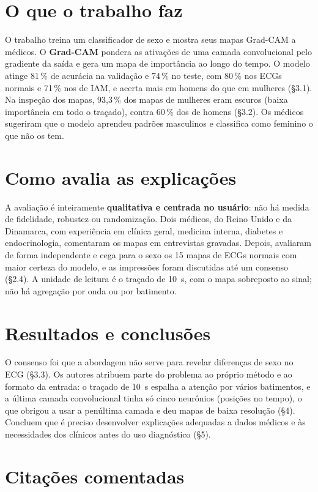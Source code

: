 \documentclass[11pt,a4paper]{article}
\begin{document}
\section{O que o trabalho faz}
O trabalho treina um classificador de sexo e mostra seus mapas Grad-CAM a médicos. O \textbf{Grad-CAM} pondera as ativações de uma camada convolucional pelo gradiente da saída e gera um mapa de importância ao longo do tempo. O modelo atinge 81\,\% de acurácia na validação e 74\,\% no teste, com 80\,\% nos ECGs normais e 71\,\% nos de IAM, e acerta mais em homens do que em mulheres (§3.1). Na inspeção dos mapas, 93,3\,\% dos mapas de mulheres eram escuros (baixa importância em todo o traçado), contra 60\,\% dos de homens (§3.2). Os médicos sugeriram que o modelo aprendeu padrões masculinos e classifica como feminino o que não os tem.

\section{Como avalia as explicações}
A avaliação é inteiramente \textbf{qualitativa e centrada no usuário}: não há medida de fidelidade, robustez ou randomização. Dois médicos, do Reino Unido e da Dinamarca, com experiência em clínica geral, medicina interna, diabetes e endocrinologia, comentaram os mapas em entrevistas gravadas. Depois, avaliaram de forma independente e cega para o sexo os 15 mapas de ECGs normais com maior certeza do modelo, e as impressões foram discutidas até um consenso (§2.4). A unidade de leitura é o traçado de 10~s, com o mapa sobreposto ao sinal; não há agregação por onda ou por batimento.

\section{Resultados e conclusões}
O consenso foi que a abordagem não serve para revelar diferenças de sexo no ECG (§3.3). Os autores atribuem parte do problema ao próprio método e ao formato da entrada: o traçado de 10~s espalha a atenção por vários batimentos, e a última camada convolucional tinha só cinco neurônios (posições no tempo), o que obrigou a usar a penúltima camada e deu mapas de baixa resolução (§4). Concluem que é preciso desenvolver explicações adequadas a dados médicos e às necessidades dos clínicos antes do uso diagnóstico (§5).

\section{Citações comentadas}
\end{document}
